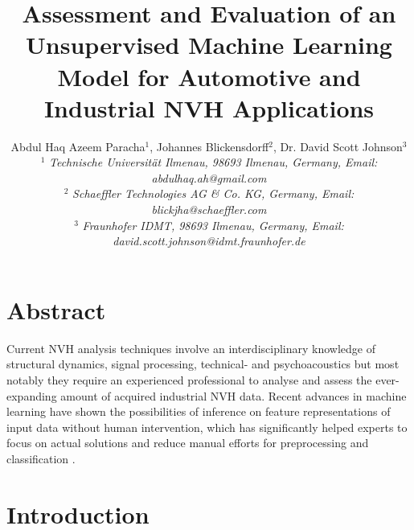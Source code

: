 \documentclass[a4paper, 10pt, twocolumn]{article}
\begin{document}
\date{}                                         %

\title{\vspace{-8mm}\textbf{\large
Assessment and Evaluation of an Unsupervised Machine Learning Model for Automotive and Industrial NVH Applications }}

\author{
Abdul Haq Azeem Paracha$^1$, Johannes Blickensdorff$^2$, Dr. David Scott Johnson$^3$ \\
$^1$ \emph{\small Technische Universität Ilmenau, 98693 Ilmenau,
Germany, Email: abdulhaq.ah@gmail.com
}\\
$^2$ \emph{\small Schaeffler Technologies AG \& Co. KG, Germany,
Email: blickjha@schaeffler.com 
}\\ 

$^3$ \emph{\small Fraunhofer IDMT, 98693 Ilmenau, Germany,
Email: david.scott.johnson@idmt.fraunhofer.de}

}
\maketitle
\thispagestyle{empty}           %


\section*{Abstract}
\label{sec:Abstract}
Current NVH analysis techniques involve an interdisciplinary knowledge of structural dynamics, signal processing, technical- and psychoacoustics but most notably they require an experienced professional to analyse and assess the ever-expanding amount of acquired industrial NVH data.
Recent advances in machine learning have shown the possibilities of inference on feature representations of input data without human intervention, which has significantly helped experts to focus on actual solutions and reduce manual efforts for preprocessing and classification \cite{b1}.

\section*{Introduction}
\label{sec:Introduction}
\end{document}
